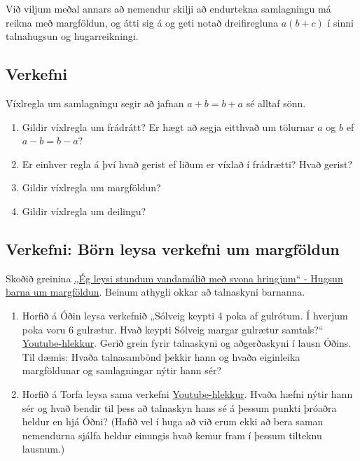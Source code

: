 \documentclass[
  icelandic,
]{book}
\providecommand{\tightlist}{%
  \setlength{\itemsep}{0pt}\setlength{\parskip}{0pt}}
\begin{document}
Við viljum meðal annars að nemendur skilji að endurtekna samlagningu má reikna með margföldun, og átti sig á og geti notað dreifiregluna \(a(b+c)\) í sinni talnahugsun og hugarreikningi.

\subsection{Verkefni}\label{verkefni-2}

Víxlregla um samlagningu segir að jafnan \(a+b = b+a\) sé alltaf sönn.

\begin{enumerate}
\def\labelenumi{\arabic{enumi}.}
\tightlist
\item
  Gildir víxlregla um frádrátt? Er hægt að segja eitthvað um tölurnar \(a\) og \(b\) ef \(a-b = b-a\)?
\item
  Er einhver regla á því hvað gerist ef liðum er víxlað í frádrætti? Hvað gerist?
\item
  Gildir víxlregla um margföldun?
\item
  Gildir víxlregla um deilingu?
\end{enumerate}

\subsection{Verkefni: Börn leysa verkefni um margföldun}\label{verkefni-buxf6rn-leysa-verkefni-um-margfuxf6ldun}

Skoðið greinina \href{https://skolathraedir.is/2021/04/21/eg-leysi-stundum-vandamalid-med-svona-hringjum-hugsun-barna-um-margfoldun/}{„Ég leysi stundum vandamálið með svona hringjum`` - Hugsun barna um margföldun}. Beinum athygli okkar að talnaskyni barnanna.

\begin{enumerate}
\def\labelenumi{\alph{enumi}.}
\item
  Horfið á Óðin leysa verkefnið „Sólveig keypti 4 poka af gulrótum. Í hverjum poka voru 6 gulrætur. Hvað keypti Sólveig margar gulrætur samtals?{}`` \href{https://youtu.be/rqlU-PLoxOs?si=U6lG57jxB6EKkLsn}{Youtube-hlekkur}. Gerið grein fyrir talnaskyni og aðgerðaskyni í lausn Óðins. Til dæmis: Hvaða talnasambönd þekkir hann og hvaða eiginleika margföldunar og samlagningar nýtir hann sér?
\item
  Horfið á Torfa leysa sama verkefni \href{https://youtu.be/OEZPAQegt9o?si=7VloBBZ5PemM2v_u}{Youtube-hlekkur}. Hvaða hæfni nýtir hann sér og hvað bendir til þess að talnaskyn hans sé á þessum punkti þróaðra heldur en hjá Óðni? (Hafið vel í huga að við erum ekki að bera saman nemendurna sjálfa heldur einungis hvað kemur fram í þessum tilteknu lausnum.)
\end{enumerate}
\end{document}
